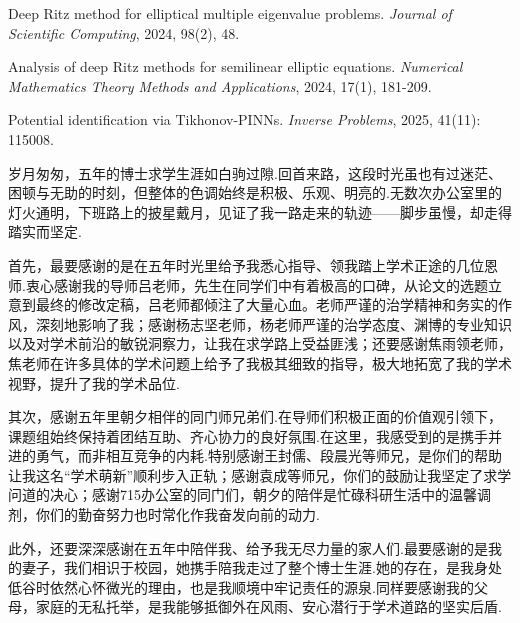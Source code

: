 

\reseachresult

\begin{enumerate}[{[1]}]
\item   Deep Ritz method for elliptical multiple eigenvalue problems. \textit{Journal of Scientific Computing}, 2024, 98(2), 48.

\item   Analysis of deep Ritz methods for semilinear elliptic equations. \textit{Numerical Mathematics Theory Methods and Applications}, 2024, 17(1), 181-209. 

\item   Potential identification via Tikhonov-PINNs. \textit{Inverse Problems}, 2025, 41(11): 115008.

\end{enumerate}


\acknowledgement



岁月匆匆，五年的博士求学生涯如白驹过隙.回首来路，这段时光虽也有过迷茫、困顿与无助的时刻，但整体的色调始终是积极、乐观、明亮的.无数次办公室里的灯火通明，下班路上的披星戴月，见证了我一路走来的轨迹——脚步虽慢，却走得踏实而坚定.

首先，最要感谢的是在五年时光里给予我悉心指导、领我踏上学术正途的几位恩师.衷心感谢我的导师吕老师，先生在同学们中有着极高的口碑，从论文的选题立意到最终的修改定稿，吕老师都倾注了大量心血。老师严谨的治学精神和务实的作风，深刻地影响了我；感谢杨志坚老师，杨老师严谨的治学态度、渊博的专业知识以及对学术前沿的敏锐洞察力，让我在求学路上受益匪浅；还要感谢焦雨领老师，焦老师在许多具体的学术问题上给予了我极其细致的指导，极大地拓宽了我的学术视野，提升了我的学术品位.

其次，感谢五年里朝夕相伴的同门师兄弟们.在导师们积极正面的价值观引领下，课题组始终保持着团结互助、齐心协力的良好氛围.在这里，我感受到的是携手并进的勇气，而非相互竞争的内耗.特别感谢王封儒、段晨光等师兄，是你们的帮助让我这名“学术萌新”顺利步入正轨；感谢袁成等师兄，你们的鼓励让我坚定了求学问道的决心；感谢715办公室的同门们，朝夕的陪伴是忙碌科研生活中的温馨调剂，你们的勤奋努力也时常化作我奋发向前的动力.

此外，还要深深感谢在五年中陪伴我、给予我无尽力量的家人们.最要感谢的是我的妻子，我们相识于校园，她携手陪我走过了整个博士生涯.她的存在，是我身处低谷时依然心怀微光的理由，也是我顺境中牢记责任的源泉.同样要感谢我的父母，家庭的无私托举，是我能够抵御外在风雨、安心潜行于学术道路的坚实后盾.

